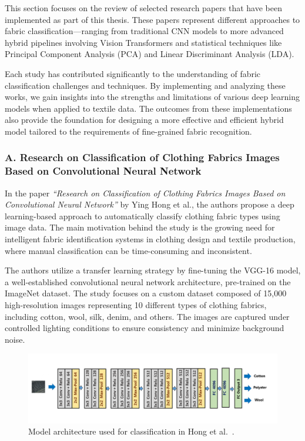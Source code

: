 This section focuses on the review of selected research papers that have been implemented as part of this thesis. These papers represent different approaches to fabric classification—ranging from traditional CNN models to more advanced hybrid pipelines involving Vision Transformers and statistical techniques like Principal Component Analysis (PCA) and Linear Discriminant Analysis (LDA).

Each study has contributed significantly to the understanding of fabric classification challenges and techniques. By implementing and analyzing these works, we gain insights into the strengths and limitations of various deep learning models when applied to textile data. The outcomes from these implementations also provide the foundation for designing a more effective and efficient hybrid model tailored to the requirements of fine-grained fabric recognition.

\subsubsection[A. Research on Classification of Clothing Fabrics Images Based on Convolutional Neural Network]{A. Research on Classification of Clothing Fabrics Images Based on Convolutional Neural Network~\cite{hong2024research}}

In the paper \textit{“Research on Classification of Clothing Fabrics Images Based on Convolutional Neural Network”} by Ying Hong et al., the authors propose a deep learning-based approach to automatically classify clothing fabric types using image data. The main motivation behind the study is the growing need for intelligent fabric identification systems in clothing design and textile production, where manual classification can be time-consuming and inconsistent.

The authors utilize a transfer learning strategy by fine-tuning the VGG-16 model, a well-established convolutional neural network architecture, pre-trained on the ImageNet dataset. The study focuses on a custom dataset composed of 15,000 high-resolution images representing 10 different types of clothing fabrics, including cotton, wool, silk, denim, and others. The images are captured under controlled lighting conditions to ensure consistency and minimize background noise.

\begin{figure}[H]
    \centering
    \begin{minipage}{1\linewidth}
        \includegraphics[width=\linewidth]{images/Paper1Model.png}
    \end{minipage}
    \caption[Model architecture - Hong et al.~\cite{hong2024research}]{Model architecture used for classification in Hong et al.~\cite{hong2024research}.}
\end{figure}

